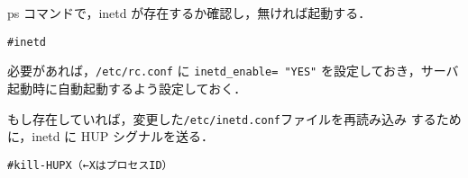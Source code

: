 ps コマンドで，inetd が存在するか確認し，無ければ起動する．
\begin{center}
\begin{breakbox}
\begin{alltt}
#inetd
\end{alltt}
\end{breakbox}
\end{center}

必要があれば，\texttt{/etc/rc.conf} に \texttt{inetd\_enable= "YES"}
を設定しておき，サーバ起動時に自動起動するよう設定しておく．

もし存在していれば，変更した\texttt{/etc/inetd.conf}ファイルを再読み込み
するために，inetd に HUP シグナルを送る．
\begin{center}
\begin{breakbox}
\begin{alltt}
# kill -HUP X  （←XはプロセスID）
\end{alltt}
\end{breakbox}
\end{center}
